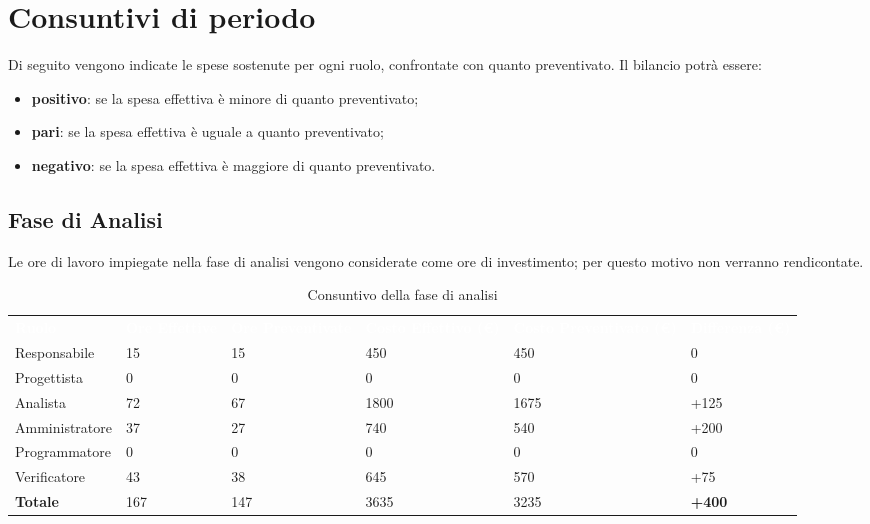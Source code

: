 \section{Consuntivi di periodo}
Di seguito vengono indicate le spese sostenute per ogni ruolo, confrontate con quanto preventivato. Il bilancio potrà essere:
\begin{itemize}
\item \textbf{positivo}: se la spesa effettiva è minore di quanto preventivato;
\item \textbf{pari}: se la spesa effettiva è uguale a quanto preventivato;
\item \textbf{negativo}: se la spesa effettiva è maggiore di quanto preventivato.
\end{itemize}

\subsection{Fase di Analisi}
Le ore di lavoro impiegate nella fase di analisi vengono considerate come ore di investimento; per questo motivo non verranno rendicontate.

\begin{table}[H]
\begin{center}
\renewcommand{\arraystretch}{1.5}
\begin{tabular}{ m{}<{\centering}  m{}<{\centering} m{}<{\centering} m{}<{\centering} m{}<{\centering} m{}<{\centering}}
	\rowcolor{darkblue}
	\textcolor{white}{\textbf{Ruolo}} & \textcolor{white}{\textbf{Ore Effettive}} & \textcolor{white}{\textbf{Ore Preventivate}} & \textcolor{white}{\textbf{Costo Effettivo (\euro)}} & \textcolor{white}{\textbf{Costo Preventivato (\euro)}}&\textcolor{white}{\textbf{Differenza (\euro)}}\\ 

	Responsabile  & 15 & 15 & 450 & 450 & 0\\	
	
	Progettista & 0 & 0 & 0 & 0 & 0\\
	
	Analista & 72 & 67 & 1800 & 1675 & +125\\
	
	Amministratore & 37 & 27 & 740 & 540 & +200\\
	
	Programmatore & 0 & 0 &0 &0 & 0\\
	
	Verificatore & 43 & 38 & 645 & 570 & +75\\
	
	\textbf{Totale} & 167 & 147 & 3635 & 3235 & \textbf{+400} \\
	
\end{tabular}
\caption{Consuntivo della fase di analisi}
\end{center}
\end{table}

